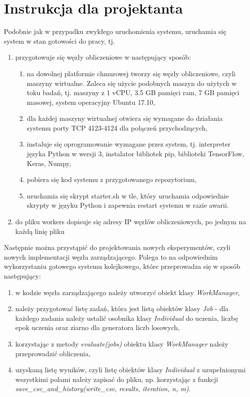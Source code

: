 \chapter[Dodatek D]{Instrukcja dla projektanta}
Podobnie jak w przypadku zwykłego uruchomienia systemu, uruchamia się system w stan gotowości do pracy, tj.
\begin{enumerate}
  \item przygotowuje się węzły obliczeniowe w następujący sposób:
  \begin{enumerate}
    \item na dowolnej platformie chmurowej tworzy się węzły obliczeniowe, czyli maszyny wirtualne.
    Zaleca się użycie podobnych maszyn do użytych w toku badań, tj. maszyny z 1 vCPU, 3.5 GB pamięci ram, 7 GB pamięci masowej, system operacyjny Ubuntu 17.10,
    \item dla każdej maszyny wirtualnej otwiera się wymagane do działania systemu porty TCP 4123-4124 dla połączeń przychodzących,
    \item instaluje się oprogramowanie wymagane przez system, tj. interpreter języka Python w wersji 3, instalator bibliotek pip, biblioteki TensorFlow, Keras, Numpy,
    \item pobiera się kod systemu z przygotowanego repozytorium,
    \item uruchamia się skrypt starter.sh w tle, który uruchamia odpowiednie skrypty w języku Python i zapewnia restart systemu w razie awarii.
  \end{enumerate}
  \item do pliku workers dopisuje się adresy IP węzłów obliczeniowych, po jednym na każdą linię pliku
\end{enumerate}

Następnie można przystąpić do projektowania nowych eksperymentów, czyli nowych implementacji węzła zarządzającego.
Polega to na odpowiednim wykorzystaniu gotowego systemu kolejkowego, które przeprowadza się w sposób następujący:
\begin{enumerate}
  \item w kodzie węzła zarządzającego należy utworzyć obiekt klasy \textit{WorkManager},
  \item należy przygotować listę zadań, która jest listą obiektów klasy \textit{Job} - dla każdego zadania należy ustalić osobnika klasy \textit{Individual} do uczenia, liczbę epok uczenia oraz ziarno dla generatora liczb losowych,
  \item korzystając z metody \textit{evaluate(jobs)} obiektu klasy \textit{WorkManager} należy przeprowadzić obliczenia,
  \item uzyskaną listę wyników, czyli listę obiektów klasy \textit{Individual} z uzupełnionymi wszystkimi polami należy zapisać do pliku, np. korzystając z funkcji \textit{save\_csv\_and\_history(write\_csv, results, iteration, n, m)}.
\end{enumerate}

